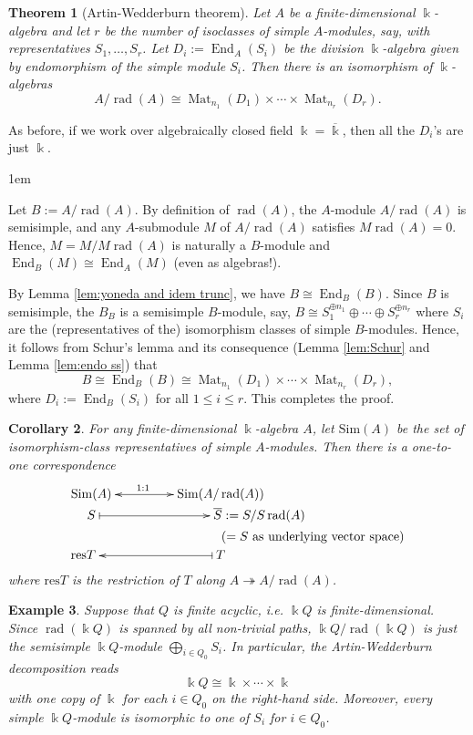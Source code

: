 \documentclass[11pt,a4paper]{article}
\makeatletter
\numberwithin{equation}{section}
\renewenvironment{proof}[1][\proofname]{\par
    \pushQED{\qed}%
    \normalfont \topsep0\p@\@plus6\p@ \labelsep1em\relax
    \trivlist
    \item[\hskip\labelsep\indent
        \bfseries #1]\ignorespaces
    \mbox{}
}{
    \popQED\endtrivlist\@endpefalse
}
\theoremstyle{all}
\newtheorem{theorem}{Theorem}[section]
\newtheorem{corollary}[theorem]{Corollary}
\newtheorem{example}[theorem]{Example}
\theoremstyle{remark}
\newcommand{\rad}{\operatorname{rad}\nolimits}
\newcommand{\End}{\operatorname{End}\nolimits}
\newcommand{\Mat}{\operatorname{Mat}\nolimits}
\makeatother
\begin{document}
\begin{theorem}[Artin-Wedderburn theorem]
Let $A$ be a finite-dimensional $\Bbbk$-algebra and let $r$ be the number of isoclasses of simple $A$-modules, say, with representatives $S_1,\ldots, S_r$.
Let $D_i:=\End_A(S_i)$ be the division $\Bbbk$-algebra given by endomorphism of the simple module $S_i$.
Then there is an isomorphism of $\Bbbk$-algebras
\[
A/\rad(A) \cong \Mat_{n_1}(D_1) \times \cdots \times \Mat_{n_r}(D_r).
\]
\end{theorem}
As before, if we work over algebraically closed field $\Bbbk=\overline{\Bbbk}$, then all the $D_i$'s are just $\Bbbk$.
\begin{proof}
Let $B:=A/\rad(A)$.
By definition of $\rad(A)$, the $A$-module $A/\rad(A)$ is semisimple, and any $A$-submodule $M$ of $A/\rad(A)$ satisfies $M\rad(A)=0$.  Hence, $M=M/M\rad(A)$ is naturally a $B$-module and $\End_B(M)\cong \End_A(M)$ (even as algebras!).

By Lemma \ref{lem:yoneda and idem trunc}, we have $B\cong \End_B(B)$.  Since $B$ is semisimple, the $B_B$ is a semisimple $B$-module, say, $B\cong S_1^{\oplus n_1}\oplus \cdots \oplus S_r^{\oplus n_r}$ where $S_i$ are the (representatives of the) isomorphism classes of simple $B$-modules.  Hence, it follows from Schur's lemma and its consequence (Lemma \ref{lem:Schur} and Lemma \ref{lem:endo ss}) that 
\[
B\cong \End_B(B) \cong \Mat_{n_1}(D_1)\times\cdots \times \Mat_{n_r}(D_r),
\]
where $D_i:=\End_B(S_i)$ for all $1\leq i\leq r$.  This completes the proof.
\end{proof}


\begin{corollary}\label{cor:simple corresp}
For any finite-dimensional $\Bbbk$-algebra $A$, let $\mathrm{Sim}(A)$ be the set of isomorphism-class representatives of simple $A$-modules.
Then there is a one-to-one correspondence 
\[
\xymatrix@R=0pt@C=5pt{
\mathrm{Sim}(A) \ar@{<->}[r]^(.4){1:1} & \mathrm{Sim}(A/\rad(A))\\
**[l]S\ar@{|->}[r] & **[r]{\overline{S}:=S/S\rad(A)}\\
& **[r]{\;\; (=S\text{ as underlying vector space})}\\
**[l]\mathrm{res}T &  T \ar@{|->}[l] }
\]
where $\mathrm{res}T$ is the restriction of $T$ along $A\twoheadrightarrow A/\rad(A)$.
\end{corollary}

\begin{example}
Suppose that $Q$ is finite acyclic, i.e. $\Bbbk Q$ is finite-dimensional.  Since $\rad (\Bbbk Q)$ is spanned by all non-trivial paths, $\Bbbk Q/\rad(\Bbbk Q)$ is just the semisimple $\Bbbk Q$-module $\bigoplus_{i\in Q_0} S_i$.  
In particular, the Artin-Wedderburn decomposition reads
\[
\Bbbk Q \cong \Bbbk \times \cdots \times \Bbbk
\]
with one copy of $\Bbbk$ for each $i\in Q_0$ on the right-hand side.
Moreover, every simple $\Bbbk Q$-module is isomorphic to one of $S_i$ for $i\in Q_0$.
\end{example}
\end{document}
